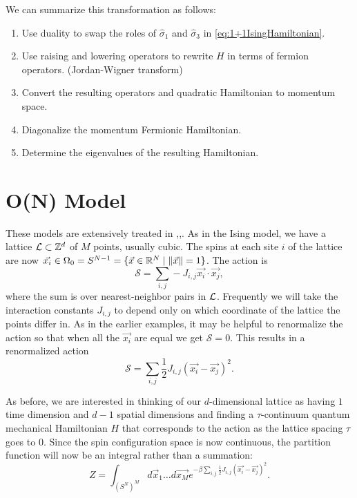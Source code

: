 \documentclass[11pt,reqno]{amsart}
\begin{document}
    We can summarize this transformation as follows:
    \begin{enumerate}
    	\item Use duality to swap the roles of $\hat{\sigma}_1$ and $\hat{\sigma}_3$ in \cref{eq:1+1IsingHamiltonian}.
    	\item Use raising and lowering operators to rewrite $H$ in terms of fermion operators. (Jordan-Wigner transform)
    	\item Convert the resulting operators and quadratic Hamiltonian to momentum space.
    	\item Diagonalize the momentum Fermionic Hamiltonian.
    	\item Determine the eigenvalues of the resulting Hamiltonian.
    \end{enumerate}
	
	\section{O(N) Model}
	
	These models are extensively treated in \cite{FradkinSusskind78},\cite{HamerKogutSusskind79},\cite{KogutGaugeSummary}. 
	As in the Ising model, we have a lattice $\mathcal{L} \subset \mathbb{Z}^d$ of $M$ points, usually cubic. 
	The spins at each site $i$ of the lattice are now $\vec{x_i} \in \Omega_0=S^{N-1} = \{\vec{x} \in \mathbb{R}^{N} \mid \|\vec{x}\|=1 \}$. 
	The action is
	\[\mathcal{S}=\sum_{i,j} -J_{i,j}\vec{x_i}\cdot\vec{x_j}, \] where the sum is over nearest-neighbor pairs in $\mathcal{L}$.
	Frequently we will take the interaction constants $J_{i,j}$ to depend only on which coordinate of the lattice the points differ in.
	As in the earlier examples, it may be helpful to renormalize the action so that when all the $\vec{x_i}$ are equal we get $\mathcal{S}=0$. 
	This results in a renormalized action
	\[\mathcal{S}=\sum_{i,j}\frac{1}{2} J_{i,j}(\vec{x_i}-\vec{x_j})^2. \]
	
	As before, we are interested in thinking of our $d$-dimensional lattice as having $1$ time dimension and $d-1$ spatial dimensions and finding a $\tau$-continuum quantum mechanical Hamiltonian $H$ that corresponds to the action as the lattice spacing $\tau$ goes to $0$.
	Since the spin configuration space is now continuous, the partition function will now be an integral rather than a summation:
	\[ Z=\int_{(S^N)^M} d\vec{x}_1\ldots d\vec{x_M} e^{-\beta\sum_{i,j}\frac{1}{2} J_{i,j}(\vec{x_i}-\vec{x_j})^2}. \]
	
\end{document}
